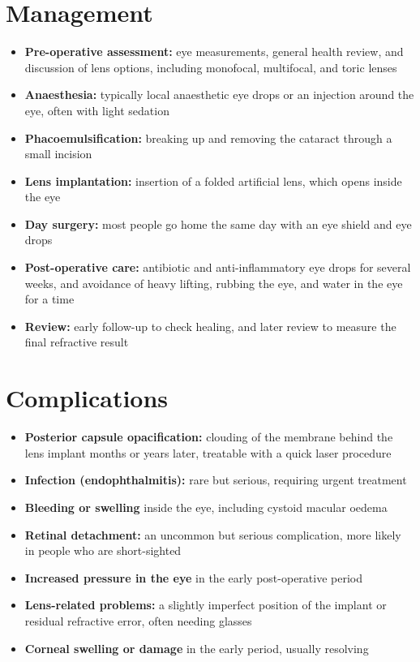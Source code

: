 \section*{Management}
\begin{itemize}
    \item \textbf{Pre-operative assessment:} eye measurements, general health review, and discussion of lens options, including monofocal, multifocal, and toric lenses
    \item \textbf{Anaesthesia:} typically local anaesthetic eye drops or an injection around the eye, often with light sedation
    \item \textbf{Phacoemulsification:} breaking up and removing the cataract through a small incision
    \item \textbf{Lens implantation:} insertion of a folded artificial lens, which opens inside the eye
    \item \textbf{Day surgery:} most people go home the same day with an eye shield and eye drops
    \item \textbf{Post-operative care:} antibiotic and anti-inflammatory eye drops for several weeks, and avoidance of heavy lifting, rubbing the eye, and water in the eye for a time
    \item \textbf{Review:} early follow-up to check healing, and later review to measure the final refractive result
\end{itemize}

\section*{Complications}
\begin{itemize}
    \item \textbf{Posterior capsule opacification:} clouding of the membrane behind the lens implant months or years later, treatable with a quick laser procedure
    \item \textbf{Infection (endophthalmitis):} rare but serious, requiring urgent treatment
    \item \textbf{Bleeding or swelling} inside the eye, including cystoid macular oedema
    \item \textbf{Retinal detachment:} an uncommon but serious complication, more likely in people who are short-sighted
    \item \textbf{Increased pressure in the eye} in the early post-operative period
    \item \textbf{Lens-related problems:} a slightly imperfect position of the implant or residual refractive error, often needing glasses
    \item \textbf{Corneal swelling or damage} in the early period, usually resolving
\end{itemize}

